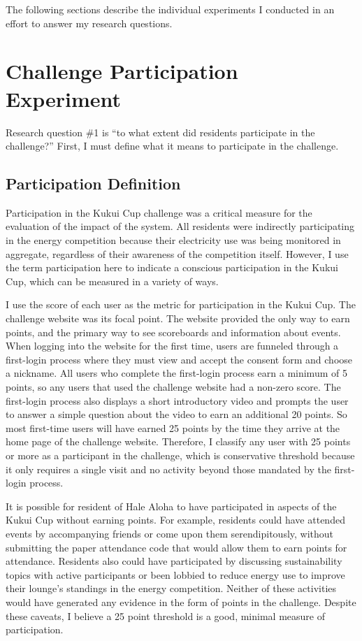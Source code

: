 The following sections describe the individual experiments I conducted in an effort to answer my research questions.


\section{Challenge Participation Experiment}
\label{sec:participation-exp}

Research question \#1 is ``to what extent did residents participate in the challenge?'' First, I must define what it means to participate in the challenge.

\subsection{Participation Definition}
\label{sec:participation}

Participation in the Kukui Cup challenge was a critical measure for the evaluation of the impact of the system. All residents were indirectly participating in the energy competition because their electricity use was being monitored in aggregate, regardless of their awareness of the competition itself. However, I use the term participation here to indicate a conscious participation in the Kukui Cup, which can be measured in a variety of ways.

I use the score of each user as the metric for participation in the Kukui Cup. The challenge website was its focal point. The website provided the only way to earn points, and the primary way to see scoreboards and information about events. When logging into the website for the first time, users are funneled through a first-login process where they must view and accept the consent form and choose a nickname. All users who complete the first-login process earn a minimum of 5 points, so any users that used the challenge website had a non-zero score. The first-login process also displays a short introductory video and prompts the user to answer a simple question about the video to earn an additional 20 points. So most first-time users will have earned 25 points by the time they arrive at the home page of the challenge website. Therefore, I classify any user with 25 points or more as a participant in the challenge, which is conservative threshold because it only requires a single visit and no activity beyond those mandated by the first-login process.

It is possible for resident of Hale Aloha to have participated in aspects of the Kukui Cup without earning points. For example, residents could have attended events by accompanying friends or come upon them serendipitously, without submitting the paper attendance code that would allow them to earn points for attendance. Residents also could have participated by discussing sustainability topics with active participants or been lobbied to reduce energy use to improve their lounge's standings in the energy competition. Neither of these activities would have generated any evidence in the form of points in the challenge. Despite these caveats, I believe a 25 point threshold is a good, minimal measure of participation.

